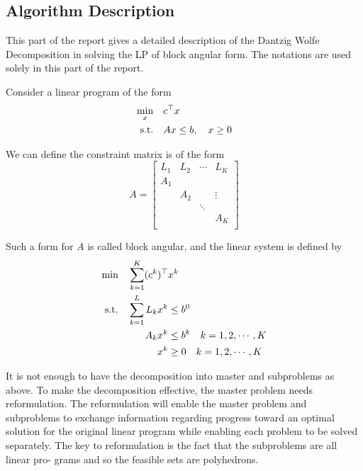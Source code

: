\subsection{Algorithm Description}
This part of the report gives a detailed description of the Dantzig Wolfe Decomposition \cite{dantzig1960decomposition} in solving the LP of block angular form. The notations are used solely in this part of the report.

Consider a linear program of the form
\begin{equation}
\begin{split}
            \min_x &\quad c^\top x\\
    {\rm s.t.}&\quad Ax\leq b, \quad x\geq 0
\end{split}
\end{equation}

We can define the constraint matrix is of the form
\begin{equation}
    A=\left[
    \begin{matrix}
    L_1&L_2&\cdots&L_K\\
    A_1& & &\\
    & A_2&&\vdots\\
    &&\ddots &\\
    &&&A_K\\
    \end{matrix}
    \right]
\end{equation}

Such a form for $A$ is called block angular, and the linear system is defined by
\begin{equation}
\label{eq:dantzig_origin}
\begin{split}
        \min\quad  \sum_{k=1}^K (c^k)^\top & x^k\\
    {\rm s.t.} \quad \sum_{k=1}^L L_k x^k&\leq b^0\\
    A_k x^k &\leq b^k\quad k=1,2,\cdots,K\\
    x^k&\geq 0\quad k=1,2,\cdots,K
\end{split}
\end{equation}

It is not enough to have the decomposition into master and subproblems as
above. To make the decomposition effective, the master problem needs reformulation. The reformulation will enable the master problem and subproblems
to exchange information regarding progress toward an optimal solution for the
original linear program while enabling each problem to be solved separately.
The key to reformulation is the fact that the subproblems are all linear pro-
grams and so the feasible sets are polyhedrons.


